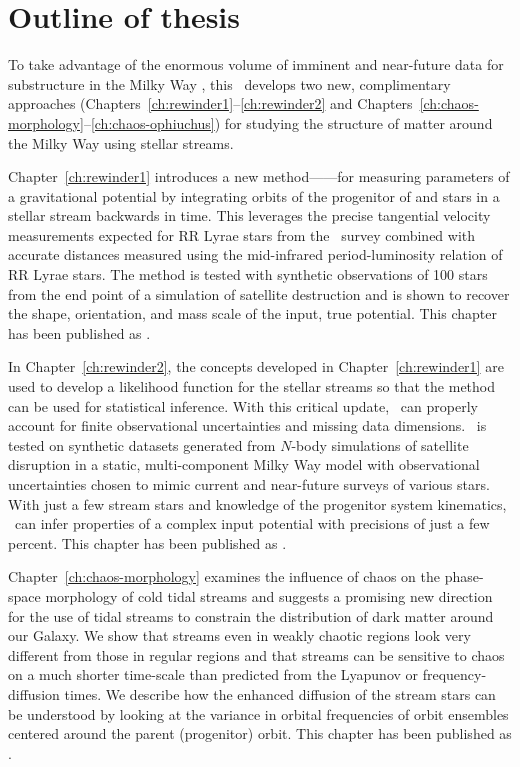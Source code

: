 \section{Outline of thesis}

To take advantage of the enormous volume of imminent and near-future data for
substructure in the Milky Way \mwhalo, this \article\ develops two new,
complimentary approaches (Chapters~\ref{ch:rewinder1}--\ref{ch:rewinder2} and
Chapters~\ref{ch:chaos-morphology}--\ref{ch:chaos-ophiuchus}) for studying the
structure of matter around the Milky Way using stellar streams.

Chapter~\ref{ch:rewinder1} introduces a new method---\rewinder---for measuring
parameters of a gravitational potential by integrating orbits of the progenitor
of and stars in a stellar stream backwards in time. This leverages the precise
tangential velocity measurements expected for RR Lyrae stars from the \gaia\
survey combined with accurate distances measured using the mid-infrared
period-luminosity relation of RR Lyrae stars. The method is tested with
synthetic observations of 100 stars from the end point of a simulation of
satellite destruction and is shown to recover the shape, orientation, and mass
scale of the input, true potential. This chapter has been published as
\citep{apw13}.

In Chapter~\ref{ch:rewinder2}, the concepts developed in
Chapter~\ref{ch:rewinder1} are used to develop a likelihood function for the
stellar streams so that the method can be used for statistical inference. With
this critical update, \rewinder\ can properly account for finite observational
uncertainties and missing data dimensions. \rewinder\ is tested on synthetic
datasets generated from $N$-body simulations of satellite disruption in a
static, multi-component Milky Way model with observational uncertainties chosen
to mimic current and near-future surveys of various stars. With just a few
stream stars and knowledge of the progenitor system kinematics, \rewinder\ can
infer properties of a complex input potential with precisions of just a few
percent. This chapter has been published as \citep{apw14}.

Chapter~\ref{ch:chaos-morphology} examines the influence of chaos on the
phase-space morphology of cold tidal streams and suggests a promising new
direction for the use of tidal streams to constrain the distribution of dark
matter around our Galaxy. We show that streams even in weakly chaotic regions
look very different from those in regular regions and that streams can be
sensitive to chaos on a much shorter time-scale than predicted from the Lyapunov
or frequency-diffusion times. We describe how the enhanced diffusion of the
stream stars can be understood by looking at the variance in orbital frequencies
of orbit ensembles centered around the parent (progenitor) orbit. This chapter
has been published as \citep{apw15-chaos}.

